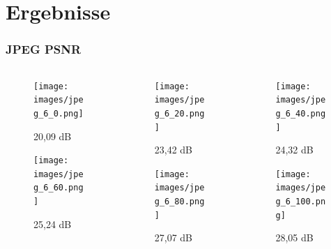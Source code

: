 \documentclass[xcolor=dvipsnames]{beamer}
\begin{document}
\begin{frame}
\begin{columns}
\begin{column}{5cm}
		\end{column}
	\end{columns}
\end{frame}

\section{Ergebnisse}
\begin{frame}
	\frametitle{JPEG PSNR}
	\begin{columns}
		\begin{column}{3cm}
			\begin{figure}
				\texttt{[image: images/jpeg\_6\_0.png]}
				\caption{20,09 dB}
			\end{figure}
			\begin{figure}
				\texttt{[image: images/jpeg\_6\_60.png]}
				\caption{25,24 dB}
			\end{figure}
		\end{column}
		\begin{column}{3cm}
			\begin{figure}
				\texttt{[image: images/jpeg\_6\_20.png]}
				\caption{23,42 dB}
			\end{figure}
			\begin{figure}
				\texttt{[image: images/jpeg\_6\_80.png]}
				\caption{27,07 dB}
			\end{figure}
		\end{column}
		\begin{column}{3cm}
			\begin{figure}
				\texttt{[image: images/jpeg\_6\_40.png]}
				\caption{24,32 dB}
			\end{figure}
			\begin{figure}
				\texttt{[image: images/jpeg\_6\_100.png]}
				\caption{28,05 dB}
			\end{figure}
		\end{column}
	\end{columns}
\end{frame}
\end{document}
